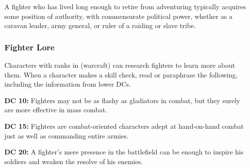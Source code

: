 A fighter who has lived long enough to retire from adventuring typically acquires some position of authority, with commensurate political power, whether as a caravan leader, army general, or ruler of a raiding or slave tribe.

\subsubsection{Fighter Lore}

Characters with ranks in  (warcraft) can research fighters to learn more about them. When a character makes a skill check, read or paraphrase the following, including the information from lower DCs.

\textbf{DC 10:} Fighters may not be as flashy as gladiators in combat, but they surely are more effective in mass combat.

\textbf{DC 15:} Fighters are combat-oriented characters adept at hand-on-hand combat just as well as commanding entire armies.

\textbf{DC 20:} A fighter's mere presence in the battlefield can be enough to inspire his soldiers and weaken the resolve of his enemies.
